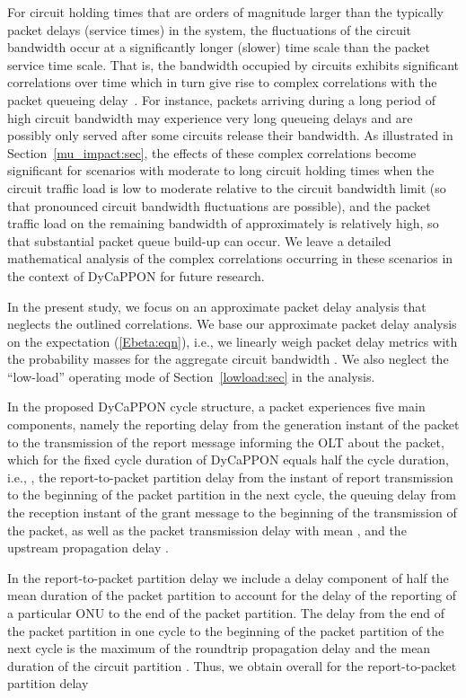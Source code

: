 \documentclass[article]{IEEEtran}
\begin{document}
For circuit holding times that are orders of magnitude larger than
the typically packet delays (service times) in the system, the
fluctuations of the circuit bandwidth  occur at a
significantly longer (slower) time scale than the packet service
time scale. That is, the bandwidth  occupied by circuits
exhibits significant correlations over time which in turn give rise
to complex correlations with the packet queueing
delay~\cite{wein80,tham83}. For instance, packets arriving during a
long period of high circuit bandwidth may experience very long
queueing delays and are possibly only served after some circuits
release their bandwidth. As illustrated in
Section~\ref{mu_impact:sec}, the effects of these complex
correlations become significant for scenarios with moderate to long
circuit holding times  when the circuit traffic load is low
to moderate relative to the circuit bandwidth limit  (so that
pronounced circuit bandwidth fluctuations are possible), and the
packet traffic load on the remaining bandwidth of approximately  is relatively high, so that substantial packet queue build-up
can occur. We leave a detailed mathematical analysis of the complex
correlations occurring in these scenarios in the context of DyCaPPON
for future research.

In the present study, we focus on an approximate
packet delay analysis that neglects the outlined correlations.
We base our approximate packet delay analysis
on the expectation  (\ref{Ebeta:eqn}),
i.e., we linearly weigh packet delay metrics 
with the probability masses  for the aggregate
circuit bandwidth .
We also neglect the ``low-load'' operating mode of
Section~\ref{lowload:sec} in the analysis.

In the proposed DyCaPPON cycle structure, a packet experiences five
main components, namely  the reporting delay from the
generation instant of the packet to the transmission of the report
message informing the OLT about the packet,
which for the fixed cycle duration of DyCaPPON
equals half the cycle duration, i.e., ,
 the report-to-packet partition delay 
from the instant of report
transmission to the beginning of the packet partition in the next
cycle,
 the queuing delay  from the reception instant of the
grant message to the beginning of the transmission of the packet, as
well as  the packet transmission delay with mean ,
and  the upstream propagation delay .

In the report-to-packet partition delay we include a delay component
of half the mean duration of the packet partition 
to account for the
delay of the reporting of a particular ONU to the end of the packet partition.
The delay from the end of the packet partition in one cycle
to the beginning of the packet partition of the next cycle is the
maximum of the roundtrip propagation delay  and the mean
duration of the circuit partition .
Thus, we obtain overall for the report-to-packet partition delay
\end{document}
